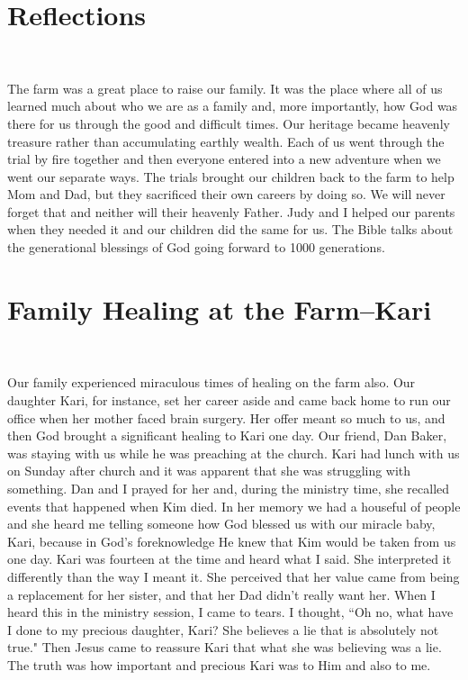 \documentclass[oneside]{book}
\begin{document}
\section{Reflections}
\

The farm was a great place to raise our family. It was the place where all of us learned much about who we are as a family and, more importantly, how God was there for us through the good and difficult times. Our heritage became heavenly treasure rather than accumulating earthly wealth. Each of us went through the trial by fire together and then everyone entered into a new adventure when we went our separate ways. The trials brought our children back to the farm to help Mom and Dad, but they sacrificed their own careers by doing so. We will never forget that and neither will their heavenly Father. Judy and I helped our parents when they needed it and our children did the same for us. The Bible talks about the generational blessings of God going forward to 1000 generations.


\section{Family Healing at the Farm--Kari}
\

Our family experienced miraculous times of healing on the farm also. Our daughter Kari, for instance, set her career aside and came back home to run our office when her mother faced brain surgery. Her offer meant so much to us, and then God brought a significant healing to Kari one day. Our friend, Dan Baker, was staying with us while he was preaching at the church. Kari had lunch with us on Sunday after church and it was apparent that she was struggling with something. Dan and I prayed for her and, during the ministry time, she recalled events that happened when Kim died. In her memory we had a houseful of people and she heard me telling someone how God blessed us with our miracle baby, Kari, because in God's foreknowledge He knew that Kim would be taken from us one day. Kari was fourteen at the time and heard what I said. She interpreted it differently than the way I meant it. She perceived that her value came from being a replacement for her sister, and that her Dad didn't really want her. When I heard this in the ministry session, I came to tears. I thought, ``Oh no, what have I done to my precious daughter, Kari? She believes a lie that is absolutely not true." Then Jesus came to reassure Kari that what she was believing was a lie. The truth was how important and precious Kari was to Him and also to me. 
\end{document}
